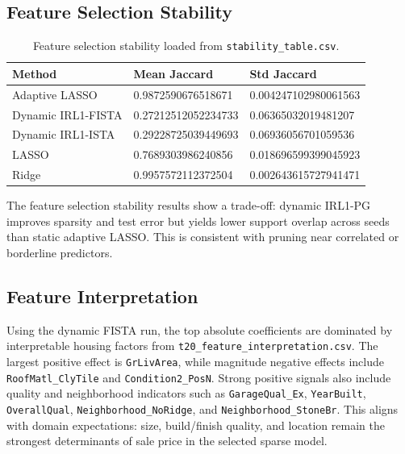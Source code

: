 \documentclass[12pt,a4paper]{article}
\newcommand{\fmtjac}[1]{\num[round-mode=places,round-precision=4,group-separator={}]{#1}}
\begin{document}
\subsection{Feature Selection Stability}

\begin{table}[H]
\centering
\caption{Feature selection stability loaded from \texttt{stability\_table.csv}.}
\label{tab:stability}
\small
\begin{tabular}{lll}
\toprule
\textbf{Method} & \textbf{Mean Jaccard} & \textbf{Std Jaccard}\\
\midrule
Adaptive LASSO & \fmtjac{0.9872590676518671} & \fmtjac{0.004247102980061563}\\
Dynamic IRL1-FISTA & \fmtjac{0.27212512052234733} & \fmtjac{0.06365032019481207}\\
Dynamic IRL1-ISTA & \fmtjac{0.29228725039449693} & \fmtjac{0.06936056701059536}\\
LASSO & \fmtjac{0.7689303986240856} & \fmtjac{0.018696599399045923}\\
Ridge & \fmtjac{0.9957572112372504} & \fmtjac{0.002643615727941471}\\
\bottomrule
\end{tabular}
\end{table}

The feature selection stability results show a trade-off: dynamic IRL1-PG improves
sparsity and test error but yields lower support overlap across seeds than static
adaptive LASSO. This is consistent with pruning near correlated or borderline
predictors.

\subsection{Feature Interpretation}

Using the dynamic FISTA run, the top absolute coefficients are dominated by
interpretable housing factors from \texttt{t20\_feature\_interpretation.csv}. The
largest positive effect is \texttt{GrLivArea}, while magnitude negative effects include
\texttt{RoofMatl\_ClyTile} and \texttt{Condition2\_PosN}. Strong positive signals also
include quality and neighborhood indicators such as \texttt{GarageQual\_Ex},
\texttt{YearBuilt}, \texttt{OverallQual}, \texttt{Neighborhood\_NoRidge}, and
\texttt{Neighborhood\_StoneBr}. This aligns with domain expectations: size,
build/finish quality, and location remain the strongest determinants of sale price in
the selected sparse model.
\end{document}
